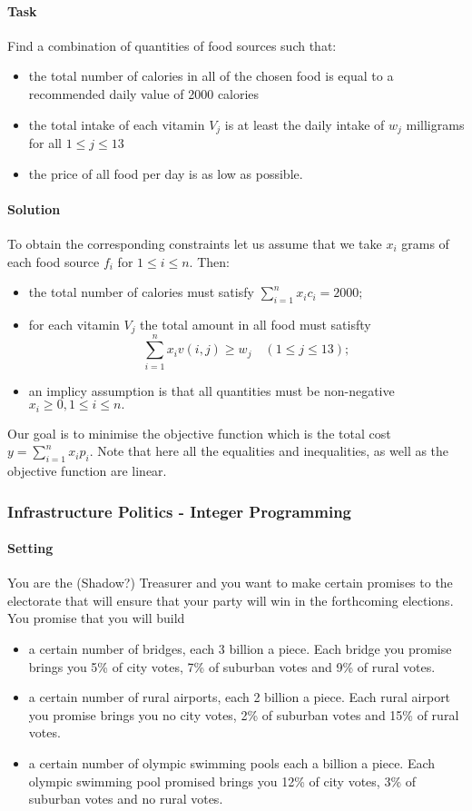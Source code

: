 \paragraph{Task} 
Find a combination of quantities of food sources such that:
\begin{itemize}
    \item the total number of calories in all of the chosen food is equal to a recommended daily value of 2000 calories
    \item the total intake of each vitamin \(V_j\) is at least the daily intake of \(w_j\) milligrams for all \(1 \leq j \leq 13\)
    \item the price of all food per day is as low as possible.
\end{itemize}

\paragraph{Solution}
To obtain the corresponding constraints let us assume that we take \(x_i\) grams of each food source \(f_i\) for \(1 \leq i \leq n\). Then:
\begin{itemize}
    \item the total number of calories must satisfy \(\sum_{i=1}^n x_ic_i = 2000;\)
    \item for each vitamin \(V_j\) the total amount in all food must satisfty
    \[\sum_{i=1}^n x_iv(i,j) \geq w_j \quad (1\leq j \leq 13);\]
    \item an implicy assumption is that all quantities must be non-negative \(x_i \geq 0, 1 \leq i \leq n.\)
\end{itemize}
Our goal is to minimise the objective function which is the total cost \(y = \sum_{i=1}^n x_ip_i\). Note that here all the equalities and inequalities, as well as the objective function are linear. 

\subsubsection{Infrastructure Politics - Integer Programming}
\paragraph{Setting} 
You are the (Shadow?) Treasurer and you want to make certain promises to the electorate that will ensure that your party will win in the forthcoming elections. You promise that you will build 
\begin{itemize}
    \item a certain number of bridges, each 3 billion a piece. Each bridge you promise brings you 5\% of city votes, 7\% of suburban votes and 9\% of rural votes.
    \item a certain number of rural airports, each 2 billion a piece. Each rural airport you promise brings you no city votes, 2\% of suburban votes and 15\% of rural votes.
    \item a certain number of olympic swimming pools each a billion a piece. Each olympic swimming pool promised brings you 12\% of city votes, 3\% of suburban votes and no rural votes.
\end{itemize}

